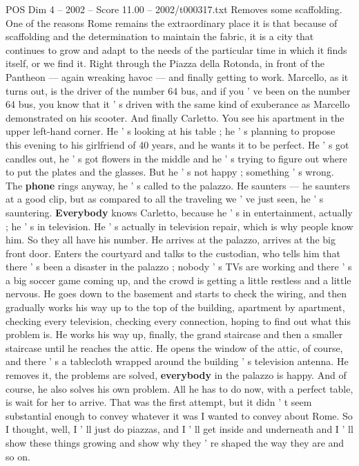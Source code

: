 \begin{textsample}{POS Dim 4 – 2002 – Score 11.00 – 2002/t000317.txt}
Removes some scaffolding.
One of the reasons Rome remains the extraordinary place it is that because of scaffolding and the determination to maintain the fabric, it is a city that continues to grow and adapt to the needs of the particular time in which it finds itself, or we find it.
Right through the Piazza della Rotonda, in front of the Pantheon — again wreaking havoc — and finally getting to work.
Marcello, as it turns out, is the driver of the number 64 bus, and if you ' ve been on the number 64 bus, you know that it ' s driven with the same kind of exuberance as Marcello demonstrated on his scooter.
And finally Carletto.
You see his apartment in the upper left-hand corner.
He ' s looking at his table ; he ' s planning to propose this evening to his girlfriend of 40 years, and he wants it to be perfect.
He ' s got candles out, he ' s got flowers in the middle and he ' s trying to figure out where to put the plates and the glasses.
But he ' s not happy ; something ' s wrong.
The \textbf{phone} rings anyway, he ' s called to the palazzo.
He saunters — he saunters at a good clip, but as compared to all the traveling we ' ve just seen, he ' s sauntering. \textbf{Everybody} knows Carletto, because he ' s in entertainment, actually ; he ' s in television.
He ' s actually in television repair, which is why people know him.
So they all have his number.
He arrives at the palazzo, arrives at the big front door.
Enters the courtyard and talks to the custodian, who tells him that there ' s been a disaster in the palazzo ; nobody ' s TVs are working and there ' s a big soccer game coming up, and the crowd is getting a little restless and a little nervous.
He goes down to the basement and starts to check the wiring, and then gradually works his way up to the top of the building, apartment by apartment, checking every television, checking every connection, hoping to find out what this problem is.
He works his way up, finally, the grand staircase and then a smaller staircase until he reaches the attic.
He opens the window of the attic, of course, and there ' s a tablecloth wrapped around the building ' s television antenna.
He removes it, the problems are solved, \textbf{everybody} in the palazzo is happy.
And of course, he also solves his own problem.
All he has to do now, with a perfect table, is wait for her to arrive.
That was the first attempt, but it didn ' t seem substantial enough to convey whatever it was I wanted to convey about Rome.
So I thought, well, I ' ll just do piazzas, and I ' ll get inside and underneath and I ' ll show these things growing and show why they ' re shaped the way they are and so on.

\end{textsample}
